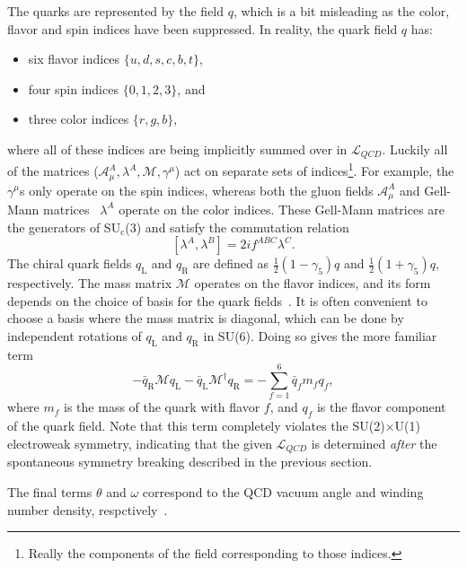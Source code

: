 The quarks are represented by the field $q$, which is a bit misleading as the color, flavor and spin indices have been suppressed. In reality, the quark field $q$ has:
%
\begin{itemize}
    \item six flavor indices $\{u, d, s, c, b, t\}$,
    \item four spin indices $\{0, 1, 2, 3\}$, and
    \item three color indices $\{r, g, b\}$,
\end{itemize}
%
where all of these indices are being implicitly summed over in $\mathcal{L}_{QCD}$. Luckily all of the matrices ($\mathcal{A}_\mu^A, \lambda^A, \mathcal{M}, \gamma^\mu$) act on separate sets of indices\footnote{Really the components of the field corresponding to those indices.}. For example, the $\gamma^\mu$s only operate on the spin indices, whereas both the gluon fields $\mathcal{A}_\mu^A$ and Gell-Mann matrices~\cite{GellMannMatrix} $\lambda^A$ operate on the color indices. These Gell-Mann matrices are the generators of SU$_\text{c}$(3) and satisfy the commutation relation
%
\begin{equation}
    \label{eq:gell_mann_commutation}
    [\lambda^A, \lambda^B] = 2if^{ABC}\lambda^C.
\end{equation}
%
The chiral quark fields $q_\text{L}$ and $q_\text{R}$ are defined as $\frac{1}{2}(1 - \gamma_5)q$ and $\frac{1}{2}(1 + \gamma_5)q$, respectively. The mass matrix $\mathcal{M}$ operates on the flavor indices, and its form depends on the choice of basis for the quark fields~\cite{QCDHistory}. It is often convenient to choose a basis where the mass matrix is diagonal, which can be done by independent rotations of $q_\text{L}$ and $q_\text{R}$ in SU(6). Doing so gives the more familiar term
%
\begin{equation}
    -\bar{q}_{\mathrm{R}} \mathcal{M} q_{\mathrm{L}}-\bar{q}_{\mathrm{L}} \mathcal{M}^{\dagger} q_{\mathrm{R}} = -\sum_{f = 1}^{6}\bar{q}_f m_f q_f,
    \label{eq:mass_matrix}
\end{equation}
where $m_f$ is the mass of the quark with flavor $f$, and $q_f$ is the flavor component of the quark field. Note that this term completely violates the SU(2)$\times$U(1) electroweak symmetry, indicating that the given $\mathcal{L}_{QCD}$ is determined \textit{after} the spontaneous symmetry breaking described in the previous section.

The final terms $\theta$ and $\omega$ correspond to the QCD vacuum angle and winding number density, respctively~\cite{VacuumAngle, WindingNumber}.




